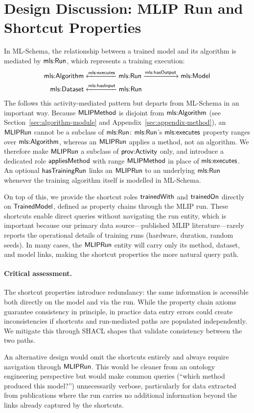 \section{Design Discussion: MLIP Run and Shortcut Properties}
\label{sec:appendix-run}

In ML-Schema, the relationship between a trained model and its algorithm is
mediated by $\mathsf{mls{:}Run}$, which represents a training execution:
%
\begin{align*}
  \mathsf{mls{:}Algorithm}
    &\xleftarrow{\mathsf{mls{:}executes}}
    \mathsf{mls{:}Run}
    \xrightarrow{\mathsf{mls{:}hasOutput}}
    \mathsf{mls{:}Model} \\
  \mathsf{mls{:}Dataset}
    &\xleftarrow{\mathsf{mls{:}hasInput}}
    \mathsf{mls{:}Run}
\end{align*}
%
The \MLIPsOntology{} follows this activity-mediated pattern but departs
from ML-Schema in an important way. Because $\mathsf{MLIPMethod}$ is disjoint
from $\mathsf{mls{:}Algorithm}$ (see Section~\ref{sec:algorithm-module} and
Appendix~\ref{sec:appendix-method}), an $\mathsf{MLIPRun}$ cannot be a subclass
of $\mathsf{mls{:}Run}$: $\mathsf{mls{:}Run}$'s $\mathsf{mls{:}executes}$ property ranges over
$\mathsf{mls{:}Algorithm}$, whereas an $\mathsf{MLIPRun}$ applies a method, not an
algorithm. We therefore make $\mathsf{MLIPRun}$ a subclass of $\mathsf{prov{:}Activity}$
only, and introduce a dedicated role $\mathsf{appliesMethod}$ with range
$\mathsf{MLIPMethod}$ in place of $\mathsf{mls{:}executes}$. An optional
$\mathsf{hasTrainingRun}$ links an $\mathsf{MLIPRun}$ to an underlying $\mathsf{mls{:}Run}$
whenever the training algorithm itself is modelled in ML-Schema.

On top of this, we provide the shortcut roles $\mathsf{trainedWith}$ and
$\mathsf{trainedOn}$ directly on $\mathsf{TrainedModel}$, defined as property chains
through the MLIP run. These shortcuts enable direct queries without
navigating the run entity, which is important because our primary data
source---published MLIP literature---rarely reports the operational
details of training runs (hardware, duration, random seeds). In many
cases, the $\mathsf{MLIPRun}$ entity will carry only its method, dataset, and
model links, making the shortcut properties the more natural query
path.

\paragraph{Critical assessment.}
The shortcut properties introduce redundancy: the same information is
accessible both directly on the model and via the run. While the property
chain axioms guarantee consistency in principle, in practice data entry
errors could create inconsistencies if shortcuts and run-mediated paths are
populated independently. We mitigate this through SHACL shapes that
validate consistency between the two paths.

An alternative design would omit the shortcuts entirely and always require
navigation through $\mathsf{MLIPRun}$. This would be cleaner from an ontology
engineering perspective but would make common queries (``which method
produced this model?'') unnecessarily verbose, particularly for data
extracted from publications where the run carries no additional information
beyond the links already captured by the shortcuts.
